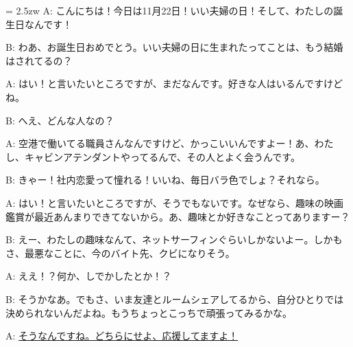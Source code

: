 \documentclass[11pt]{amsart}
\title{}
\author{}
\newenvironment{hangall}[1]{\hangindent = 2.5zw\everypar{\hangindent = 2.5zw}}{}
\begin{document}
\maketitle
\begin{hangall}{}%
A: こんにちは！今日は11月22日！いい夫婦の日！そして、わたしの誕生日なんです！

B: わあ、お誕生日おめでとう。いい夫婦の日に生まれたってことは、もう結婚はされてるの？

A: はい！と言いたいところですが、まだなんです。好きな人はいるんですけどね。

B: へえ、どんな人なの？

A: 空港で働いてる職員さんなんですけど、かっこいいんですよー！あ、わたし、キャビンアテンダントやってるんで、その人とよく会うんです。

B: きゃー！社内恋愛って憧れる！いいね、毎日バラ色でしょ？それなら。

A: はい！と言いたいところですが、そうでもないです。なぜなら、趣味の映画鑑賞が最近あんまりできてないから。あ、趣味とか好きなことってありますー？

B: えー、わたしの趣味なんて、ネットサーフィンぐらいしかないよー。しかもさ、最悪なことに、今のバイト先、クビになりそう。

A: ええ！？何か、しでかしたとか！？

B: そうかなあ。でもさ、いま友達とルームシェアしてるから、自分ひとりでは決められないんだよね。もうちょっとこっちで頑張ってみるかな。

A: \ul{そうなんですね。どちらにせよ、応援してますよ！}\end{hangall}
\end{document}
